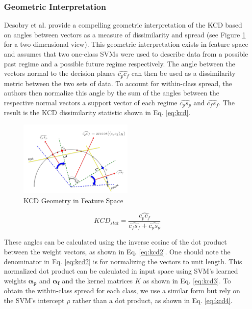 \documentclass[conference,letterpaper]{IEEEtran}
\begin{document}
\subsubsection{Geometric Interpretation}

Desobry et al. provide a compelling geometric interpretation of the KCD based on angles between vectors as a measure of dissimilarity and spread (see Figure \ref{fig:kcdGeo} for a two-dimensional view). 
This geometric interpretation exists in feature space and assumes that two one-class SVMs were used to describe data from a possible past regime and a possible future regime respectively. 
The angle between the vectors normal to the decision planes $\widehat{c_pc_f}$ can then be used as a dissimilarity metric between the two sets of data.
To account for within-class spread, the authors then normalize this angle by the sum of the angles between the respective normal vectors a support vector of each regime $\widehat{c_ps_p}$ and $\widehat{c_fs_f}$.
The result is the KCD dissimilarity statistic shown in Eq. \ref{eq:kcd}.

\begin{figure}[htbp]
\begin{center}
\includegraphics[width=0.5\textwidth]{kcd.png}
\caption{KCD Geometry in Feature Space}
\label{fig:kcdGeo}
\end{center}
\end{figure}

\begin{equation}
\label{eq:kcd}
KCD_{stat} = \frac{\widehat{c_pc_f}}{\widehat{c_fs_f} + \widehat{c_ps_p}}
\end{equation}

These angles can be calculated using the inverse cosine of the dot product between the weight vectors, as shown in Eq. \ref{eq:kcd2}.
One should note the denominator in Eq. \ref{eq:kcd2} is for normalizing the vectors to unit length.
This normalized dot product can be calculated in input space using SVM's learned weights $\boldsymbol{\alpha_p}$ and $\boldsymbol{\alpha_f}$ and the kernel matrices $K$ as shown in Eq. \ref{eq:kcd3}.
To obtain the within-class spread for each class, we use a similar form but rely on the SVM's intercept $\rho$ rather than a dot product, as shown in Eq. \ref{eq:kcd4}.
\end{document}
